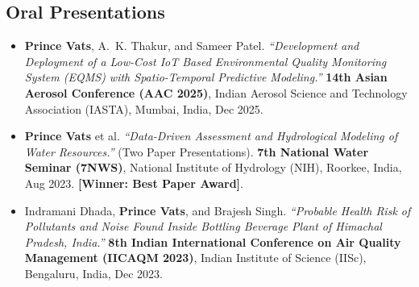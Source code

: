 \documentclass[10pt,a4paper]{article}
\begin{document}
\subsection*{Oral Presentations}
\begin{itemize}
    \item \textbf{Prince Vats}, A.~K. Thakur, and Sameer Patel. \textit{``Development and Deployment of a Low-Cost IoT Based Environmental Quality Monitoring System (EQMS) with Spatio-Temporal Predictive Modeling.''} \textbf{14th Asian Aerosol Conference (AAC 2025)}, Indian Aerosol Science and Technology Association (IASTA), Mumbai, India, Dec 2025.
    \item \textbf{Prince Vats} et al. \textit{``Data-Driven Assessment and Hydrological Modeling of Water Resources.''} (Two Paper Presentations). \textbf{7th National Water Seminar (7NWS)}, National Institute of Hydrology (NIH), Roorkee, India, Aug 2023. \textbf{[Winner: Best Paper Award]}.
    \item Indramani Dhada, \textbf{Prince Vats}, and Brajesh Singh. \textit{``Probable Health Risk of Pollutants and Noise Found Inside Bottling Beverage Plant of Himachal Pradesh, India.''} \textbf{8th Indian International Conference on Air Quality Management (IICAQM 2023)}, Indian Institute of Science (IISc), Bengaluru, India, Dec 2023.
\end{itemize}
\end{document}
